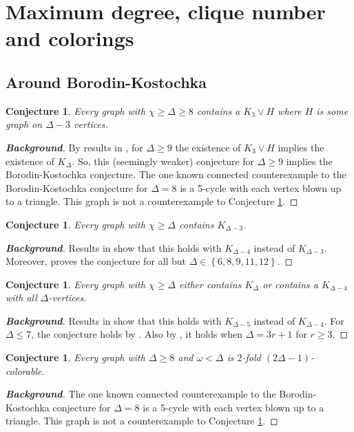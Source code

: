 \documentclass[12pt]{article}
\theoremstyle{plain}
\newtheorem{conjecture}[thm]{Conjecture}
\theoremstyle{definition}
\theoremstyle{remark}
\newcommand{\set}[1]{\left\{ #1 \right\}}
\begin{document}
\section{Maximum degree, clique number and colorings}
\subsection{Around Borodin-Kostochka}
\begin{conjecture}\label{C3}
Every graph with $\chi \ge \Delta \ge 8$ contains a $K_3 \vee H$ where $H$ is some graph on $\Delta - 3$ vertices.
\end{conjecture}
\begin{proof}[\textbf{Background}]
By results in \cite{mules}, for $\Delta \ge 9$ the existence of $K_3 \vee H$ implies the existence of $K_\Delta$.  
So, this (seemingly weaker) conjecture for $\Delta \ge 9$ implies the Borodin-Kostochka conjecture.  The one known connected counterexample to 
the Borodin-Kostochka conjecture for $\Delta=8$ is a 5-cycle with each vertex blown up to a triangle.  This graph is not a counterexample to Conjecture \ref{C3}.
\end{proof}

\begin{conjecture}\label{C4}
Every graph with $\chi \ge \Delta$ contains $K_{\Delta-3}$.
\end{conjecture}
\begin{proof}[\textbf{Background}]
Results in \cite{bigcliques} show that this holds with $K_{\Delta-4}$ instead of $K_{\Delta-3}$.  Moreover, \cite{bigcliques} proves the conjecture for all but $\Delta \in \set{6,8,9,11,12}$.
\end{proof}

\begin{conjecture}\label{C5}
Every graph with $\chi \ge \Delta$ either contains $K_{\Delta}$ or contains a $K_{\Delta-4}$ with all $\Delta$-vertices.
\end{conjecture}
\begin{proof}[\textbf{Background}]
Results in \cite{bigcliques} show that this holds with $K_{\Delta-5}$ instead of $K_{\Delta-4}$. For $\Delta \le 7$, the conjecture holds by \cite{rabern2010a, krs_one}.
Also by \cite{bigcliques}, it holds when $\Delta = 3r+1$ for $r \ge 3$.
\end{proof}

\begin{conjecture}\label{C6}
Every graph with $\Delta \ge 8$ and $\omega < \Delta$ is $2$-fold $(2\Delta - 1)$-colorable.
\end{conjecture}
\begin{proof}[\textbf{Background}]
The one known connected counterexample to the Borodin-Kostochka conjecture for $\Delta=8$ is a 5-cycle with each vertex blown up to a triangle.  This graph is not a counterexample to Conjecture \ref{C6}.
\end{proof}
\end{document}

